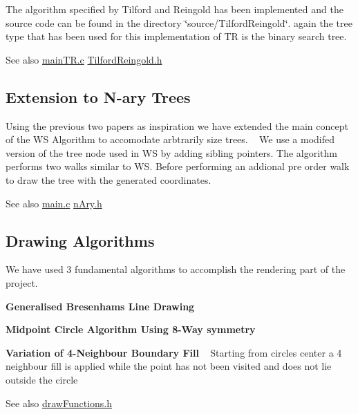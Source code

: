 The algorithm specified by Tilford and Reingold has been implemented and the source code can be found in the directory \char`\"{}source/\+Tilford\+Reingold\char`\"{}. again the tree type that has been used for this implementation of TR is the binary search tree. \begin{DoxySeeAlso}{See also}
\hyperlink{main_t_r_8c}{main\+T\+R.\+c} \hyperlink{_tilford_reingold_8h}{Tilford\+Reingold.\+h} 
\end{DoxySeeAlso}
\hypertarget{index_algo3}{}\subsection{Extension to N-\/ary Trees}\label{index_algo3}
Using the previous two papers as inspiration we have extended the main concept of the WS Algorithm to accomodate arbtrarily size trees. ~\newline
 We use a modifed version of the tree node used in WS by adding sibling pointers. The algorithm performs two walks similar to WS. Before performing an addional pre order walk to draw the tree with the generated coordinates. \begin{DoxySeeAlso}{See also}
\hyperlink{main_8c}{main.\+c} \hyperlink{n_ary_8h}{n\+Ary.\+h}
\end{DoxySeeAlso}
\hypertarget{index_extra_algos}{}\subsection{Drawing Algorithms}\label{index_extra_algos}
We have used 3 fundamental algorithms to accomplish the rendering part of the project.
\begin{DoxyEnumerate}
\item {\bfseries  Generalised Bresenham\textquotesingle{}s Line Drawing }
\item {\bfseries  Midpoint Circle Algorithm Using 8-\/\+Way symmetry }
\item {\bfseries  Variation of 4-\/\+Neighbour Boundary Fill } ~\newline
 Starting from circle\textquotesingle{}s center a 4 neighbour fill is applied while the point has not been visited and does not lie outside the circle\textquotesingle{}
\end{DoxyEnumerate}

\begin{DoxySeeAlso}{See also}
\hyperlink{draw_functions_8h}{draw\+Functions.\+h} 
\end{DoxySeeAlso}
